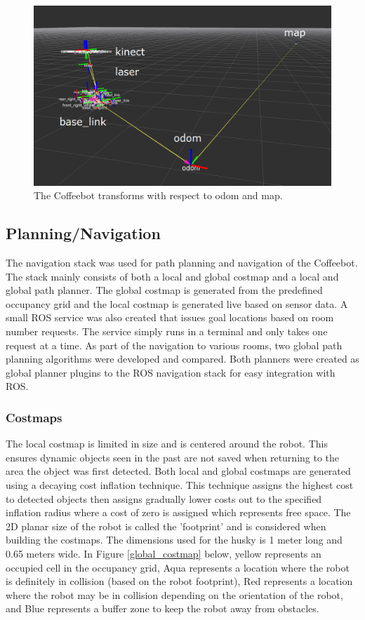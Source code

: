 \documentclass[letterpaper, 10 pt, conference]{ieeeconf}  %
\begin{document}
	\begin{figure}[!ht]
		\centering
		\includegraphics[width=1.0\columnwidth]{Figures/Transforms}
		\caption{The Coffeebot transforms with respect to odom and map.}
		\label{transforms}
	\end{figure}

\subsection{Planning/Navigation}

The navigation stack was used for path planning and navigation of the Coffeebot. The stack mainly consists of both a local and global costmap and a local and global path planner. The global costmap is generated from the predefined occupancy grid and the local costmap is generated live based on sensor data. A small ROS service was also created that issues goal locations based on room number requests. The service simply runs in a terminal and only takes one request at a time. As part of the navigation to various rooms, two global path planning algorithms were developed and compared. Both planners were created as global planner plugins to the ROS navigation stack for easy integration with ROS.

\subsubsection{Costmaps}

The local costmap is limited in size and is centered around the robot. This ensures dynamic objects seen in the past are not saved when returning to the area the object was first detected. Both local and global costmaps are generated using a decaying cost inflation technique. This technique assigns the highest cost to detected objects then assigns gradually lower costs out to the specified inflation radius where a cost of zero is assigned which represents free space. The 2D planar size of the robot is called the 'footprint' and is considered when building the costmaps. The dimensions used for the husky is 1 meter long and 0.65 meters wide. In Figure \ref{global_costmap} below, yellow represents an occupied cell in the occupancy grid, Aqua represents a location where the robot is definitely in collision (based on the robot footprint), Red represents a location where the robot may be in collision depending on the orientation of the robot, and Blue represents a buffer zone to keep the robot away from obstacles.
\end{document}
